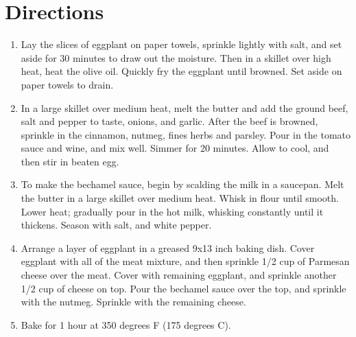 \documentclass[twoside,letterpaper]{article}
\begin{document}
\section{Directions}
\begin{enumerate}
\item Lay the slices of eggplant on paper towels, sprinkle lightly with salt, and set aside for 30 minutes to draw out the moisture. Then in a skillet over high heat, heat the olive oil. Quickly fry the eggplant until browned. Set aside on paper towels to drain.
\item In a large skillet over medium heat, melt the butter and add the ground beef, salt and pepper to taste, onions, and garlic. After the beef is browned, sprinkle in the cinnamon, nutmeg, fines herbs and parsley. Pour in the tomato sauce and wine, and mix well. Simmer for 20 minutes. Allow to cool, and then stir in beaten egg.
\item To make the bechamel sauce, begin by scalding the milk in a saucepan. Melt the butter in a large skillet over medium heat. Whisk in flour until smooth. Lower heat; gradually pour in the hot milk, whisking constantly until it thickens. Season with salt, and white pepper.
\item Arrange a layer of eggplant in a greased 9x13 inch baking dish. Cover eggplant with all of the meat mixture, and then sprinkle 1/2 cup of Parmesan cheese over the meat. Cover with remaining eggplant, and sprinkle another 1/2 cup of cheese on top. Pour the bechamel sauce over the top, and sprinkle with the nutmeg. Sprinkle with the remaining cheese.
\item Bake for 1 hour at 350 degrees F (175 degrees C).
\end{enumerate}
\end{document}
